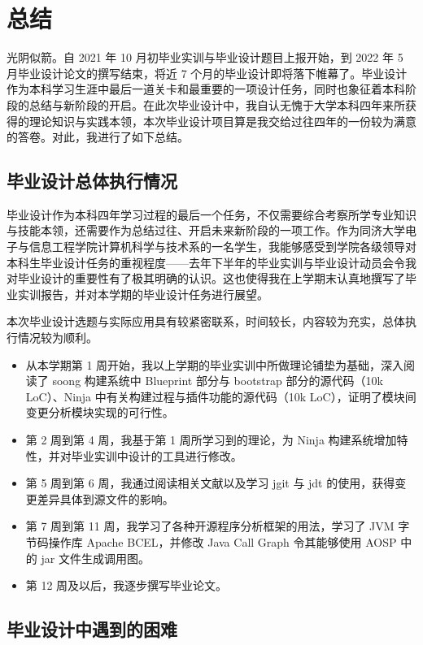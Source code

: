 \section{总结}\label{summary}

光阴似箭。自 2021 年 10 月初毕业实训与毕业设计题目上报开始，到 2022 年 5 月毕业设计论文的撰写结束，将近 7 个月的毕业设计即将落下帷幕了。毕业设计作为本科学习生涯中最后一道关卡和最重要的一项设计任务，同时也象征着本科阶段的总结与新阶段的开启。在此次毕业设计中，我自认无愧于大学本科四年来所获得的理论知识与实践本领，本次毕业设计项目算是我交给过往四年的一份较为满意的答卷。对此，我进行了如下总结。

\subsection{毕业设计总体执行情况}

毕业设计作为本科四年学习过程的最后一个任务，不仅需要综合考察所学专业知识与技能本领，还需要作为总结过往、开启未来新阶段的一项工作。作为同济大学电子与信息工程学院计算机科学与技术系的一名学生，我能够感受到学院各级领导对本科生毕业设计任务的重视程度——去年下半年的毕业实训与毕业设计动员会令我对毕业设计的重要性有了极其明确的认识。这也使得我在上学期末认真地撰写了毕业实训报告，并对本学期的毕业设计任务进行展望。

本次毕业设计选题与实际应用具有较紧密联系，时间较长，内容较为充实，总体执行情况较为顺利。

\begin{itemize}
    \item 从本学期第 1 周开始，我以上学期的毕业实训中所做理论铺垫为基础，深入阅读了 soong 构建系统中 Blueprint 部分与 bootstrap 部分的源代码（10k LoC）、Ninja 中有关构建过程与插件功能的源代码（10k LoC），证明了模块间变更分析模块实现的可行性。
    \item 第 2 周到第 4 周，我基于第 1 周所学习到的理论，为 Ninja 构建系统增加特性，并对毕业实训中设计的工具进行修改。
    \item 第 5 周到第 6 周，我通过阅读相关文献以及学习 jgit 与 jdt 的使用，获得变更差异具体到源文件的影响。
    \item 第 7 周到第 11 周，我学习了各种开源程序分析框架的用法，学习了 JVM 字节码操作库 Apache BCEL，并修改 Java Call Graph 令其能够使用 AOSP 中的 jar 文件生成调用图。
    \item 第 12 周及以后，我逐步撰写毕业论文。
\end{itemize}

\subsection{毕业设计中遇到的困难}


